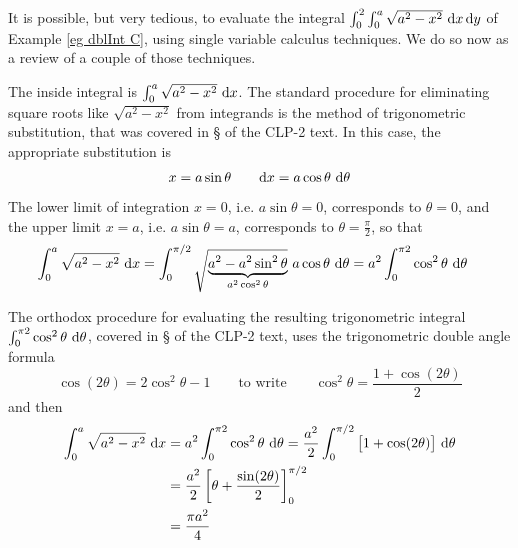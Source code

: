 \begin{eg}\label{eg dblInt CC}
It is possible, but very tedious, to evaluate the integral
$\int_0^2\int_0^a \sqrt{a^2-x^2}\ \dee{x}\,\dee{y}$
of Example \ref{eg dblInt C}, using single variable calculus
techniques. We do so now as a review of a couple of those
techniques.

The inside integral is $\int_0^a \sqrt{a^2-x^2}\ \mathrm{d}x$.
The standard procedure for eliminating square roots like $\sqrt{a^2-x^2}$
from integrands is the method of trigonometric substitution, that was
covered in \S{} of the CLP-2 text. In this
case, the appropriate substitution is
\begin{equation*}
x=a\sin\theta\qquad \mathrm{d}x=a\cos\theta\ \mathrm{d}\theta
\end{equation*} 
The lower limit of integration $x=0$, i.e. $a\sin\theta=0$, 
corresponds to $\theta=0$, and the upper limit  $x=a$, i.e. $a\sin\theta=a$, 
corresponds to $\theta=\frac{\pi}{2}$, so that
\begin{align*}
\int_0^a \sqrt{a^2-x^2}\ \mathrm{d}x
&=\int_0^{\pi/2} \sqrt{\underbrace{a^2-a^2\sin^2\theta}_{a^2\cos^2\theta}}
        \ a\cos\theta\ \mathrm{d}\theta
=a^2\int_0^{\pi2} \cos^2\theta\ \mathrm{d}\theta
\end{align*}

The orthodox procedure for evaluating the resulting trigonometric integral
$\int_0^{\pi2} \cos^2\theta\ \dee{\theta}$, covered in 
\S{} of the CLP-2 text, uses the trigonometric
double angle formula
\begin{equation*}
\cos(2\theta) = 2\cos^2\theta -1\qquad\text{to write}\qquad
\cos^2\theta =\frac{1+\cos(2\theta)}{2}
\end{equation*}
and then
\begin{align*}
\int_0^a \sqrt{a^2-x^2}\ \mathrm{d}x
&=a^2\int_0^{\pi2} \cos^2\theta\ \mathrm{d}\theta
=\frac{a^2}{2} \int_0^{\pi/2} \big[1+\cos(2\theta)\big]\ \mathrm{d}\theta \\
&=\frac{a^2}{2}\left[\theta+\frac{\sin(2\theta)}{2}\right]_0^{\pi/2} \\
&=\frac{\pi a^2}{4}
\end{align*}


\end{eg}
